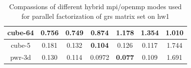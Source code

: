 \begin{table}[h!]
\begin{tabular}{|c|c|c|c|c|c|c|}
cube-64                                               & 0.756                                                     & \textbf{0.749}                                             & 0.874                                                     & 1.178                                                      & 1.354                                                      & 1.010                                                            \\ \hline
cube-5                                                & 0.181                                                     & 0.132                                                      & \textbf{0.104}                                            & 0.126                                                      & 0.117                                                      & 1.744                                                            \\ \hline
pwr-3d                                                & 0.130                                                     & 0.114                                                      & 0.0972                                                    & \textbf{0.077}                                             & 0.109                                                      & 1.691                                                            \\ \hline
\end{tabular}
\caption{Compassions of different hybrid \acrshort{mpi}/\acrshort{openmp} modes used for parallel factorization of \acrshort{grs} matrix set on \gls{hw1}}
\label{fig:mpi-omp-grs-hw1}
\end{table}



